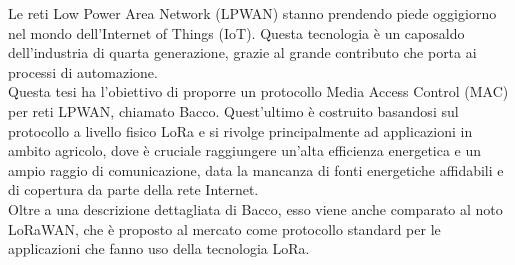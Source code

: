\begin{Sommario}
    \begin{changemargin}{1cm}{1cm}
        Le reti Low Power Area Network (LPWAN) stanno prendendo piede oggigiorno nel mondo dell'Internet of Things
        (IoT). Questa tecnologia è un caposaldo dell'industria di quarta generazione, grazie al grande contributo che
        porta ai processi di automazione.\\
        Questa tesi ha l'obiettivo di proporre un protocollo Media Access Control (MAC) per reti LPWAN, chiamato Bacco.
        Quest'ultimo è costruito basandosi sul protocollo a livello fisico LoRa e si rivolge principalmente ad applicazioni
        in ambito agricolo, dove è cruciale raggiungere un'alta efficienza energetica e un ampio raggio di comunicazione,
        data la mancanza di fonti energetiche affidabili e di copertura da parte della rete Internet.\\
        Oltre a una descrizione dettagliata di Bacco, esso viene anche comparato al noto LoRaWAN, che è proposto al
        mercato come protocollo standard per le applicazioni che fanno uso della tecnologia LoRa.
    \end{changemargin}
\end{Sommario}
